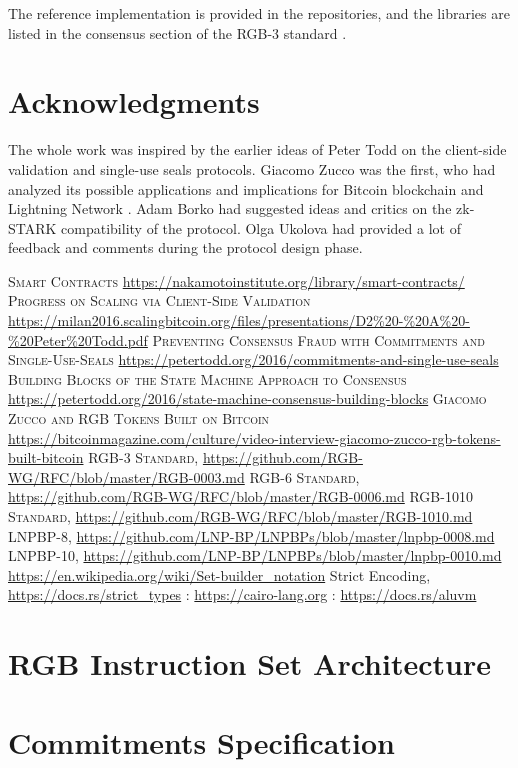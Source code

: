 \documentclass[9pt,oneside]{amsart}
\begin{document}
\begin{multicols}{2}
The reference implementation is provided in the repositories, and the libraries are listed
in the consensus section of the RGB-3 standard \cite{RGB3}.

\section{Acknowledgments}
The whole work was inspired by the earlier ideas of Peter Todd on the client-side validation \cite{CSV}
and single-use seals \cite{SUS1, SUS2} protocols. Giacomo Zucco was the first, who had analyzed its possible
applications and implications for Bitcoin blockchain and Lightning Network \cite{Zucco}.
Adam Borko had suggested ideas and critics on the zk-STARK compatibility of the protocol.
Olga Ukolova had provided a lot of feedback and comments during the protocol design phase.



\begin{thebibliography}{9}
 \textsc{Smart Contracts} \url{https://nakamotoinstitute.org/library/smart-contracts/}
 \textsc{Progress on Scaling via Client-Side Validation} \url{https://milan2016.scalingbitcoin.org/files/presentations/D2%20-%20A%20-%20Peter%20Todd.pdf}
 \textsc{Preventing Consensus Fraud with Commitments and Single-Use-Seals} \url{https://petertodd.org/2016/commitments-and-single-use-seals}
 \textsc{Building Blocks of the State Machine Approach to Consensus} \url{https://petertodd.org/2016/state-machine-consensus-building-blocks}
 \textsc{Giacomo Zucco and RGB Tokens Built on Bitcoin} \url{https://bitcoinmagazine.com/culture/video-interview-giacomo-zucco-rgb-tokens-built-bitcoin}
 \textsc{RGB-3 Standard}, \url{https://github.com/RGB-WG/RFC/blob/master/RGB-0003.md}
 \textsc{RGB-6 Standard}, \url{https://github.com/RGB-WG/RFC/blob/master/RGB-0006.md}
 \textsc{RGB-1010 Standard}, \url{https://github.com/RGB-WG/RFC/blob/master/RGB-1010.md}
 \textsc{LNPBP-8}, \url{https://github.com/LNP-BP/LNPBPs/blob/master/lnpbp-0008.md}
 \textsc{LNPBP-10}, \url{https://github.com/LNP-BP/LNPBPs/blob/master/lnpbp-0010.md}
 \url{https://en.wikipedia.org/wiki/Set-builder_notation}
 Strict Encoding, \url{https://docs.rs/strict_types}
: \url{https://cairo-lang.org}
: \url{https://docs.rs/aluvm}
\end{thebibliography}

\end{multicols}

\newpage

\appendix
\section{RGB Instruction Set Architecture}\label{AnnexA}

\newpage
\section{Commitments Specification}\label{AnnexB}

\newpage
\section{}\label{AnnexC}
\printglossaries
\end{document}
